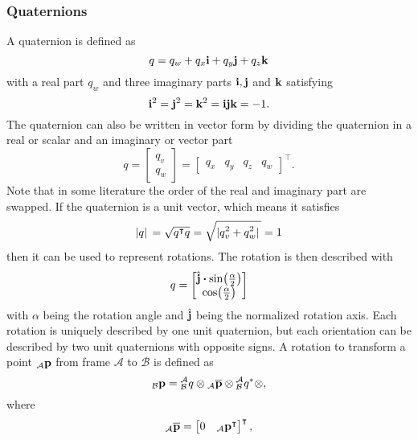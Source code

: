 \subsubsection{Quaternions}
A quaternion is defined as
\begin{equation}
	q = q_w + q_x\vb{i} + q_y\vb{j} + q_z\vb{k}
\end{equation}
with a real part $q_w$ and three imaginary parts $\vb{i}, \vb{j}$ and $\vb{k}$ satisfying
\begin{equation}
	\vb{i}^2 = \vb{j}^2 = \vb{k}^2 = \vb{i}\vb{j}\vb{k} = -1.
\end{equation}
The quaternion can also be written in vector form by dividing the quaternion in a real or scalar and an imaginary or vector part
\begin{equation}
	q = \begin{bmatrix}
		q_v \\
		q_w
	\end{bmatrix}
	=\begin{bmatrix}
		q_x & q_y & q_z & q_w
	\end{bmatrix}^\intercal.
\end{equation}
Note that in some literature the order of the real and imaginary part are swapped.
If the quaternion is a unit vector, which means it satisfies
\begin{equation}
	\abs*{q} = \sqrt{q^\intercal q} = \sqrt{\abs*{q_v^2 + q_w^2}} = 1
\end{equation}
then it can be used to represent rotations.
The rotation is then described with
\begin{equation}
	\label{eq:quaternion}
	q =
	\begin{bmatrix}
		\hat{\vb{j}}\vdot\sin(\frac{\alpha}{2}) \\
		\cos(\frac{\alpha}{2})
	\end{bmatrix}
\end{equation}
with $\alpha$ being the rotation angle and $\hat{\vb{j}}$ being the normalized rotation axis.
Each rotation is uniquely described by one unit quaternion, but each orientation can be described by two unit quaternions with opposite signs.
A rotation to transform a point ${}_\mathcal{A}\vb{p}$ from frame $\mathcal{A}$ to $\mathcal{B}$ is defined as
\begin{equation}
	{}_\mathcal{B}\vb{p} = \qtf{a}{b} \otimes {}_\mathcal{A}\overline{\vb{p}} \otimes \qtf{a}{b}^* \otimes,
\end{equation}
where
\begin{equation}
	{}_\mathcal{A}\overline{\vb{p}} = \begin{bmatrix}
		0 & {}_\mathcal{A}\vb{p}^\intercal
	\end{bmatrix}^\intercal,
\end{equation}
